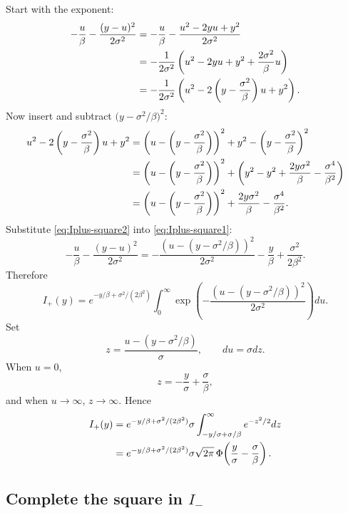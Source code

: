 \documentclass[11pt,a4paper]{article}
\newcommand{\PhiN}{\Phi}
\begin{document}
Start with the exponent:
\begin{align}
-\frac{u}{\beta} - \frac{(y-u)^2}{2\sigma^2}
&=
-\frac{u}{\beta} - \frac{u^2-2yu+y^2}{2\sigma^2}
\notag\\
&=
-\frac{1}{2\sigma^2}
\left(
 u^2 - 2yu + y^2 + \frac{2\sigma^2}{\beta}u
\right)
\notag\\
&=
-\frac{1}{2\sigma^2}
\left(
 u^2 - 2\left(y-\frac{\sigma^2}{\beta}\right)u + y^2
\right).
\label{eq:Iplus-square1}
\end{align}
Now insert and subtract $\bigl(y-\sigma^2/\beta\bigr)^2$:
\begin{align}
u^2 - 2\left(y-\frac{\sigma^2}{\beta}\right)u + y^2
&=
\left(u-\left(y-\frac{\sigma^2}{\beta}\right)\right)^2
+
y^2 - \left(y-\frac{\sigma^2}{\beta}\right)^2
\notag\\
&=
\left(u-\left(y-\frac{\sigma^2}{\beta}\right)\right)^2
+
\left(y^2 - y^2 + \frac{2y\sigma^2}{\beta} - \frac{\sigma^4}{\beta^2}\right)
\notag\\
&=
\left(u-\left(y-\frac{\sigma^2}{\beta}\right)\right)^2
+
\frac{2y\sigma^2}{\beta} - \frac{\sigma^4}{\beta^2}.
\label{eq:Iplus-square2}
\end{align}
Substitute \eqref{eq:Iplus-square2} into \eqref{eq:Iplus-square1}:
\begin{equation}
-\frac{u}{\beta} - \frac{(y-u)^2}{2\sigma^2}
=
-\frac{\left(u-(y-\sigma^2/\beta)\right)^2}{2\sigma^2}
-\frac{y}{\beta} + \frac{\sigma^2}{2\beta^2}.
\label{eq:Iplus-square3}
\end{equation}
Therefore
\begin{equation}
I_+(y)
=
 e^{-y/\beta+\sigma^2/(2\beta^2)}
\int_0^{\infty}
\exp\!\left(-\frac{(u-(y-\sigma^2/\beta))^2}{2\sigma^2}\right)du.
\label{eq:Iplus-after-square}
\end{equation}
Set
\[
z = \frac{u-(y-\sigma^2/\beta)}{\sigma},
\qquad du = \sigma dz.
\]
When $u=0$,
\[
z = -\frac{y}{\sigma} + \frac{\sigma}{\beta},
\]
and when $u\to\infty$, $z\to\infty$. Hence
\begin{align}
I_+(y)
&=
 e^{-y/\beta+\sigma^2/(2\beta^2)}
\sigma \int_{-y/\sigma+\sigma/\beta}^{\infty} e^{-z^2/2} dz
\notag\\
&=
 e^{-y/\beta+\sigma^2/(2\beta^2)}
\sigma\sqrt{2\pi}\,\PhiN\!\left(\frac{y}{\sigma}-\frac{\sigma}{\beta}\right).
\label{eq:Iplus-final}
\end{align}

\subsection[Complete the square in I-]{Complete the square in $I_-$}
\end{document}
